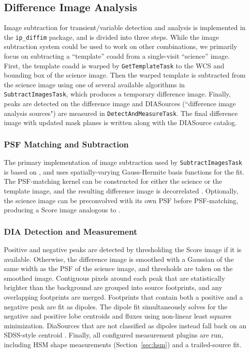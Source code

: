 \subsection{Difference Image Analysis}
\label{sec:dia}

Image subtraction for transient/variable detection and analysis is implemented in the \texttt{ip\_diffim} package, and is divided into three steps.
While the image subtraction system could be used to work on other combinations, we primarily focus on subtracting a ``template'' coadd from a single-visit ``science'' image.
First, the template coadd is warped by \texttt{GetTemplateTask} to the WCS and bounding box of the science image.
Then the warped template is subtracted from the science image using one of several available algorithms in \texttt{SubtractImagesTask}, which produces a temporary difference image.
Finally, peaks are detected on the difference image and DIASources (``difference image analysis sources") are measured in \texttt{DetectAndMeasureTask}.
The final difference image with updated mask planes is written along with the DIASource catalog.

\subsubsection{PSF Matching and Subtraction}

The primary implementation of image subtraction used by \texttt{SubtractImagesTask} is based on \citet{1998ApJ...503..325A}, and uses spatially-varying Gauss-Hermite basis functions for the fit.
The PSF-matching kernel can be constructed for either the science or the template image, and the resulting difference image is decorrelated \citet{DMTN-021}.
Optionally, the science image can be preconvolved with its own PSF before PSF-matching, producing a Score image analogous to \citet{2016ApJ...830...27Z}.

\subsubsection{DIA Detection and Measurement}
\label{sec:detectAndMeasureDiaSource}

Positive and negative peaks are detected by thresholding the Score image if it is available.
Otherwise, the difference image is smoothed with a Gaussian of the same width as the PSF of the science image, and thresholds are taken on the smoothed image.
Contiguous pixels around each peak that are statistically brighter than the background are grouped into source footprints, and any overlapping footprints are merged.
Footprints that contain both a positive and a negative peak are fit as dipoles.
The dipole fit simultaneously solves for the negative and positive lobe centroids and fluxes using non-linear least squares minimization.
DiaSources that are not classified as dipoles instead fall back on an SDSS-style centroid \citep{2003AJ....125.1559P}.
Finally, all configured measurement plugins are run, including HSM shape measurements (Section~\ref{sec:hsm}) and a trailed-source fit.

